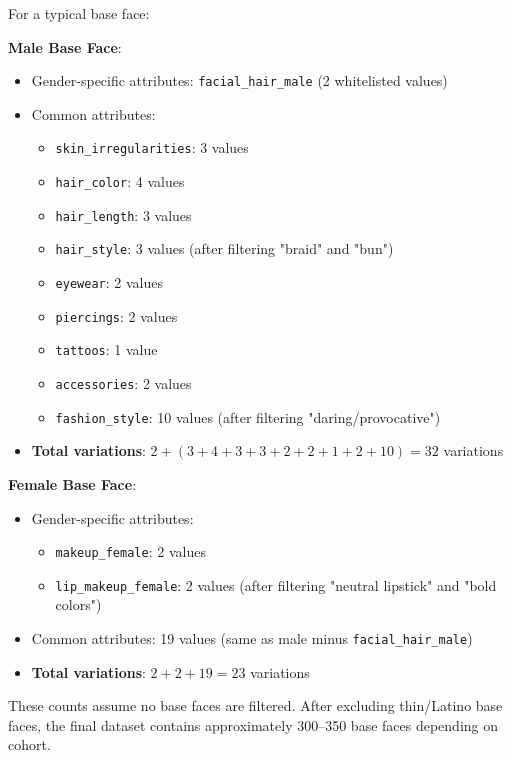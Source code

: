 For a typical base face:

\textbf{Male Base Face}:
\begin{itemize}
    \item Gender-specific attributes: \texttt{facial\_hair\_male} (2 whitelisted values)
    \item Common attributes: 
        \begin{itemize}
            \item \texttt{skin\_irregularities}: 3 values
            \item \texttt{hair\_color}: 4 values
            \item \texttt{hair\_length}: 3 values
            \item \texttt{hair\_style}: 3 values (after filtering "braid" and "bun")
            \item \texttt{eyewear}: 2 values
            \item \texttt{piercings}: 2 values
            \item \texttt{tattoos}: 1 value
            \item \texttt{accessories}: 2 values
            \item \texttt{fashion\_style}: 10 values (after filtering "daring/provocative")
        \end{itemize}
    \item \textbf{Total variations}: $2 + (3 + 4 + 3 + 3 + 2 + 2 + 1 + 2 + 10) = 32$ variations
\end{itemize}

\textbf{Female Base Face}:
\begin{itemize}
    \item Gender-specific attributes: 
        \begin{itemize}
            \item \texttt{makeup\_female}: 2 values
            \item \texttt{lip\_makeup\_female}: 2 values (after filtering "neutral lipstick" and "bold colors")
        \end{itemize}
    \item Common attributes: 19 values (same as male minus \texttt{facial\_hair\_male})
    \item \textbf{Total variations}: $2 + 2 + 19 = 23$ variations
\end{itemize}

These counts assume no base faces are filtered. After excluding thin/Latino base faces, the final dataset contains approximately 300--350 base faces depending on cohort.

